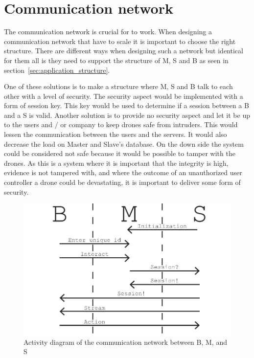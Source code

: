 \section{Communication network}

The communication network is crucial for \projectname{} to work.
When designing a communication network that have to scale it is important to choose the right structure.
There are different ways when designing such a network but identical for them all is they need to support the structure of M, S and B as seen in section~\ref{sec:application_structure}.

One of these solutions is to make a structure where M, S and B talk to each other with a level of security. 
The security aspect would be implemented with a form of session key. 
This key would be used to determine if a session between a B and a S is valid.
Another solution is to provide no security aspect and let it be up to the users and / or company to keep drones safe from intruders.
This would lessen the communication between the users and the servers.  
It would also decrease the load on Master and Slave's database. 
On the down side the system could be considered not safe because it would be possible to tamper with the drones.
As this is a system where it is important that the integrity is high, evidence is not tampered with, and where the outcome of an unauthorized user controller a drone could be devastating, it is important to deliver some form of security.

\begin{figure}[!h]
    \centering 
    \includegraphics[width=\textwidth]{gfx/activity_diagram.pdf}
    \caption{Activity diagram of the communication network between B, M, and S}
    \label{fig:activity_diagram}
\end{figure}

